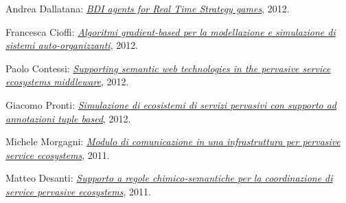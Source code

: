 \begin{innerlist}
    \item Andrea Dallatana: \href{http://amslaurea.unibo.it/4217/}{\textit{BDI agents for Real Time Strategy games}}, 2012.
    \item Francesca Cioffi: \href{http://amslaurea.unibo.it/4088/}{\textit{Algoritmi gradient-based per la modellazione e simulazione di sistemi auto-organizzanti}}, 2012.
    \item Paolo Contessi: \href{http://amslaurea.unibo.it/4074/}{\textit{Supporting semantic web technologies in the pervasive service ecosystems middleware}}, 2012.
    \item Giacomo Pronti: \href{http://archive.fo/nBeOg}{\textit{Simulazione di ecosistemi di servizi pervasivi con supporto ad annotazioni tuple based}}, 2012.
    \item Michele Morgagni: \href{http://archive.fo/6mnSN}{\textit{Modulo di comunicazione in una infrastruttura per pervasive service ecosystems}}, 2011.
    \item Matteo Desanti: \href{http://archive.fo/rwla1}{\textit{Supporto a regole chimico-semantiche per la coordinazione di service pervasive ecosystems}}, 2011.
\end{innerlist}

